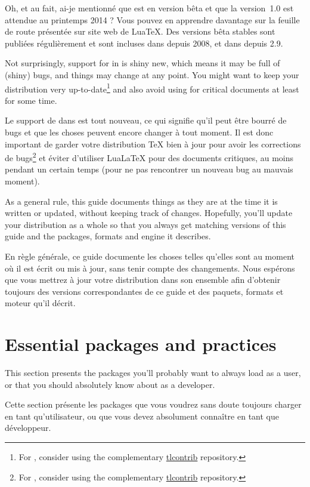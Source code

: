 \documentclass{lltxdoc}
\begin{document}
Oh, et au fait, ai-je mentionné que \luatex est en version bêta et que la version~1.0 est attendue au printemps 2014 ? Vous pouvez en apprendre davantage sur la feuille de route présentée sur site web de LuaTeX. Des versions bêta stables sont publiées régulièrement et sont incluses dans \texlive depuis 2008, et dans \miktex depuis 2.9.

Not surprisingly, support for \luatex in \latex is shiny new, which means it
may be full of (shiny) bugs, and things may change at any point. You might
want to keep your \tex distribution very up-to-date\footnote{For \texlive,
  consider using the complementary
  \href{http://tlcontrib.metatex.org/} {tlcontrib} repository.} and also avoid
using \lualatex for critical documents at least for some time.

Le support de \luatex dans \latex est tout nouveau, ce qui signifie qu'il peut être bourré de bugs et que les choses peuvent encore changer à tout moment. Il est donc important de garder votre distribution TeX bien à jour pour avoir les corrections de bugs\footnote{For \texlive, consider using the complementary \href{http://tlcontrib.metatex.org/}{tlcontrib} repository.} et éviter d'utiliser LuaLaTeX pour des documents critiques, au moins pendant un certain temps (pour ne pas rencontrer un nouveau bug au mauvais moment).

As a general rule, this guide documents things as they are at the time it is
written or updated, without keeping track of changes. Hopefully, you'll update
your distribution as a whole so that you always get matching versions of this
guide and the packages, formats and engine it describes.

En règle générale, ce guide documente les choses telles qu'elles sont au moment où il est écrit ou mis à jour, sans tenir compte des changements. Nous espérons que vous mettrez à jour votre distribution dans son ensemble afin d'obtenir toujours des versions correspondantes de ce guide et des paquets, formats et moteur qu'il décrit.


\section{Essential packages and practices}\label{essential}

This section presents the packages you'll probably want to always load as a
user, or that you should absolutely know about as a developer.

Cette section présente les packages que vous voudrez sans doute toujours charger en tant qu'utilisateur, ou que vous devez absolument connaître en tant que développeur.
\end{document}

